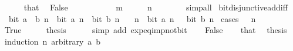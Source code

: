 \begin{isabellebody}
\ \ \ \ \isamarkupfalse%
\ that\ \isamarkupfalse%
\ False\ \isacommand{{\isachardot}{\kern0pt}{\isachardot}{\kern0pt}}\isamarkupfalse%
\isanewline
\ \ \isamarkupfalse%
\isanewline
\ \ \isamarkupfalse%
\ \isamarkupfalse%
\ {\isacartoucheopen}{}\ {\isacharcircum}{\kern0pt}\ m\ {\isasymnoteq}\ {}{\isacartoucheclose}\ \ {\isacartoucheopen}{}\ {\isacharcircum}{\kern0pt}\ n\ {\isasymnoteq}\ {}{\isacartoucheclose}\isanewline
\ \ \ \ \isamarkupfalse%
\ simp{\isacharunderscore}{\kern0pt}all\isanewline
{}\isamarkupfalse%
%
\endisatagproof
{\isafoldproof}%
%
\isadelimproof
\isanewline
%
\endisadelimproof
\isanewline
{}\isamarkupfalse%
\ bit{\isacharunderscore}{\kern0pt}disjunctive{\isacharunderscore}{\kern0pt}add{\isacharunderscore}{\kern0pt}iff{\isacharcolon}{\kern0pt}\isanewline
\ \ {\isacartoucheopen}bit\ {\isacharparenleft}{\kern0pt}a\ {\isacharplus}{\kern0pt}\ b{\isacharparenright}{\kern0pt}\ n\ {\isasymlongleftrightarrow}\ bit\ a\ n\ {\isasymor}\ bit\ b\ n{\isacartoucheclose}\isanewline
\ \ \ {\isacartoucheopen}{\isasymAnd}n{\isachardot}{\kern0pt}\ {\isasymnot}\ bit\ a\ n\ {\isasymor}\ {\isasymnot}\ bit\ b\ n{\isacartoucheclose}\isanewline
%
\isadelimproof
%
\endisadelimproof
%
\isatagproof
{}\isamarkupfalse%
\ {\isacharparenleft}{\kern0pt}cases\ {\isacartoucheopen}{}\ {\isacharcircum}{\kern0pt}\ n\ {\isacharequal}{\kern0pt}\ {}{\isacartoucheclose}{\isacharparenright}{\kern0pt}\isanewline
\ \ \isamarkupfalse%
\ True\isanewline
\ \ \isamarkupfalse%
\ \isamarkupfalse%
\ {\isacharquery}{\kern0pt}thesis\isanewline
\ \ \ \ \isamarkupfalse%
\ {\isacharparenleft}{\kern0pt}simp\ add{\isacharcolon}{\kern0pt}\ exp{\isacharunderscore}{\kern0pt}eq{\isacharunderscore}{\kern0pt}{}{\isacharunderscore}{\kern0pt}imp{\isacharunderscore}{\kern0pt}not{\isacharunderscore}{\kern0pt}bit{\isacharparenright}{\kern0pt}\isanewline
{}\isamarkupfalse%
\isanewline
\ \ \isamarkupfalse%
\ False\isanewline
\ \ \isamarkupfalse%
\ that\ \isamarkupfalse%
\ {\isacharquery}{\kern0pt}thesis\ \isamarkupfalse%
\ {\isacharparenleft}{\kern0pt}induction\ n\ arbitrary{\isacharcolon}{\kern0pt}\ a\ b{\isacharparenright}{\kern0pt}\isanewline
\ \ \ \ \isamarkupfalse%
\ {}\isanewline

\end{isabellebody}
